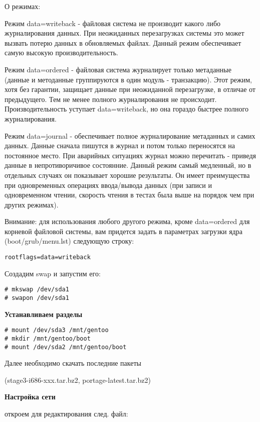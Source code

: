 \documentclass[10pt, a4paper]{article}
\begin{document}
О режимах:

Режим data=writeback - файловая система не производит какого либо журналирования данных. При неожиданных перезагрузках системы это может вызвать потерю данных в обновляемых файлах. Данный режим обеспечивает самую высокую производительность.

Режим data=ordered - файловая система журналирует только метаданные (данные и методанные группируются в один модуль - транзакцию). Этот режим, хотя без гарантии, защищает данные при неожиданной перезагрузке, в отличае от предыдущего. Тем не менее полного журналирования не происходит. Производительность уступает data=writeback, но она гораздо быстрее полного журналирования.

Режим data=journal - обеспечивает полное журналирование метаданных и самих данных. Данные сначала пишутся в журнал и потом только переносятся на постоянное место. При аварийных ситуациях журнал можно перечитать - приведя данные в непротиворичивое состоянние. Данный режим самый медленный, но в отдельных случаях он показывает хорошие результаты. Он имеет преимущества при одновременных операциях ввода/вывода данных (при записи и одновременном чтении, скорость чтения в тестах была выше на порядок чем при других режимах).


Внимание: для использования любого другого режима, кроме data=ordered для корневой файловой системы, вам придется задать в параметрах загрузки ядра (boot/grub/menu.lst) следующую строку: 

\begin{verbatim}
rootflags=data=writeback
\end{verbatim}


Создадим swap и запустим его:

\begin{verbatim}
# mkswap /dev/sda1
# swapon /dev/sda1
\end{verbatim}

{\bf Устанавливаем разделы}

\begin{verbatim}
# mount /dev/sda3 /mnt/gentoo
# mkdir /mnt/gentoo/boot
# mount /dev/sda2 /mnt/gentoo/boot
\end{verbatim}

Далее необходимо скачать последние пакеты 

(stage3-i686-xxx.tar.bz2, portage-latest.tar.bz2)

{\bf Настройка сети}

откроем для редактирования след. файл:
\end{document}
